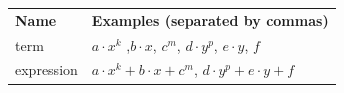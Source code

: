 {    %
        \begin{center}
      \label{m39383*uid3}
    \noindent
      \tablelasttail{}
      \begin{xtabular*}{\mytablewidth}[t]{|p{10\mystarwidth}|p{10\mystarwidth}|}\hline
        \textbf{Name} &
        \textbf{Examples (separated by commas)}%
     \tabularnewline{}
        term &
        $a\ensuremath{\cdot}{x}^{k}$ ,$b\ensuremath{\cdot}x$, ${c}^{m}$, $d\ensuremath{\cdot}{y}^{p}$, $e\ensuremath{\cdot}y$, $f$\hspace{20ex}%
     \tabularnewline{}
        expression &
        $a\ensuremath{\cdot}{x}^{k}+b\ensuremath{\cdot}x+{c}^{m}$, $d\ensuremath{\cdot}{y}^{p}+e\ensuremath{\cdot}y+f$%
     \tabularnewline{}

\end{xtabular*}
\end{center}}
